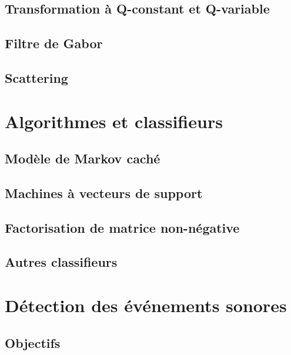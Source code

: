 \subsection{Transformation à Q-constant et Q-variable}
 \label{sec:ch6_VQT_CQT}
 
\subsection{Filtre de Gabor}
\label{sec:ch6_gabor}

\subsection{Scattering}
\label{sec:ch6_scattering}

\section{Algorithmes et classifieurs}

\subsection{Modèle de Markov caché}
\label{sec:ch6_hmm}


\subsection{Machines à vecteurs de support}
\label{sec:ch6_svm}

\subsection{Factorisation de matrice non-négative}
\label{sec:ch6_nmf}

\subsection{Autres classifieurs}
\label{sec:ch6_autresAlgo}


\section{Détection des événements sonores}
\label{sec:ch6_AED}

\subsection{Objectifs}
\label{sec:ch6_objAED}

